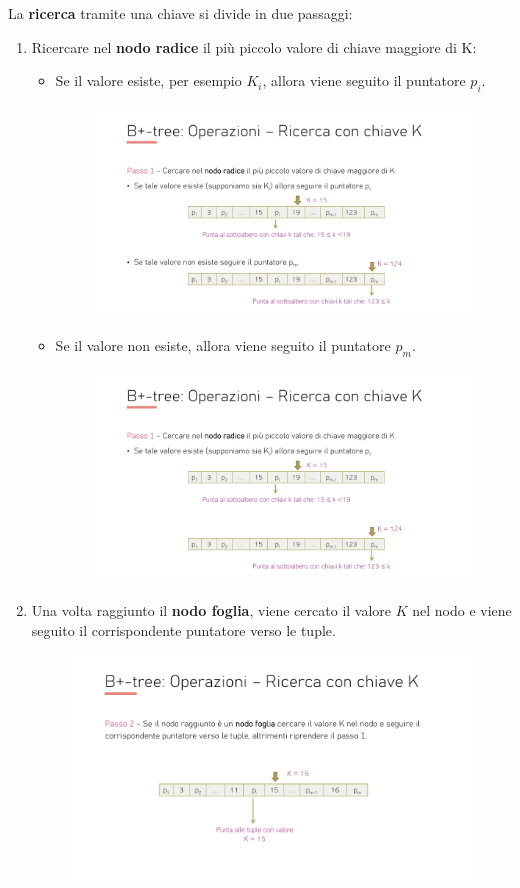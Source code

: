 \documentclass[a4paper]{article}
\begin{document}
	La \textbf{ricerca} tramite una chiave si divide in due passaggi:
	\begin{enumerate}
		\item Ricercare nel \textbf{nodo radice} il più piccolo valore di chiave maggiore di K:
		\begin{itemize}
			\item Se il valore esiste, per esempio $K_{i}$, allora viene seguito il puntatore $p_{i}$.
			\begin{figure}[!htp]
				\centering
				\includegraphics[width=.7\textwidth]{img/ricerca-1.pdf}
			\end{figure}
			
			\item Se il valore non esiste, allora viene seguito il puntatore $p_{m}$.
			\begin{figure}[!htp]
				\centering
				\includegraphics[width=.7\textwidth]{img/ricerca-2.pdf}
			\end{figure}
		\end{itemize}
		
		\item Una volta raggiunto il \textbf{nodo foglia}, viene cercato il valore $K$ nel nodo e viene seguito il corrispondente puntatore verso le tuple.
		\begin{figure}[!htp]
			\centering
			\includegraphics[width=.7\textwidth]{img/ricerca-3.pdf}
		\end{figure}
	\end{enumerate}\newpage
	
\end{document}
